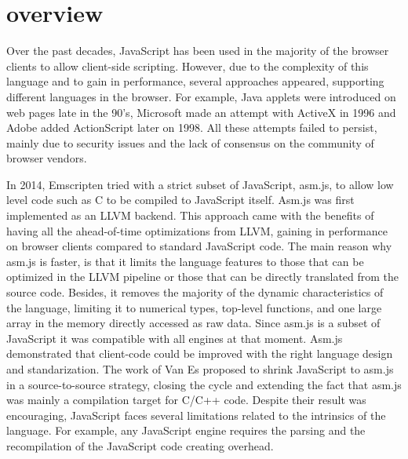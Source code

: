 \section{\wasm overview}
\label{sota:wasm}

\newcommand{\lstnumberautorefname}{Line}
\newcommand{\lineref}[1]{\autoref{#1}}




Over the past decades, JavaScript has been used in the majority of the browser clients to allow client-side scripting. However, due to the complexity of this language and to gain in performance, several approaches appeared, supporting different languages in the browser.  For example, Java applets were introduced on web pages late in the 90's, Microsoft made an attempt with ActiveX in 1996  and Adobe added ActionScript later on 1998. All these attempts failed to persist, mainly due to security issues and the lack of consensus on the community of browser vendors. 

In 2014, Emscripten tried with a strict subset of JavaScript, asm.js, to allow low level code such as C to be compiled to JavaScript itself. Asm.js was first implemented as an LLVM backend. This approach came with the benefits of having all the ahead-of-time optimizations from LLVM, gaining in performance on browser clients \cite{asmjs} compared to standard JavaScript code. The main reason why asm.js is faster, is that it limits the language features to those that can be optimized in the LLVM pipeline or those that can be directly translated from the source code. Besides, it removes the majority of the dynamic characteristics of the language, limiting it to numerical types, top-level functions, and one large array in the memory directly accessed as raw data. Since asm.js is a subset of JavaScript it was compatible with all engines at that moment. Asm.js demonstrated that client-code could be improved with the right language design and standarization.
The work of Van Es \etal \cite{EsAsm.js} proposed to shrink JavaScript to asm.js in a source-to-source strategy, closing the cycle and extending the fact that asm.js was mainly a compilation target for C/C++ code. Despite their result was encouraging, JavaScript faces several limitations related to the intrinsics of the language. For example, any JavaScript engine requires the parsing and the recompilation of the JavaScript code creating overhead.

